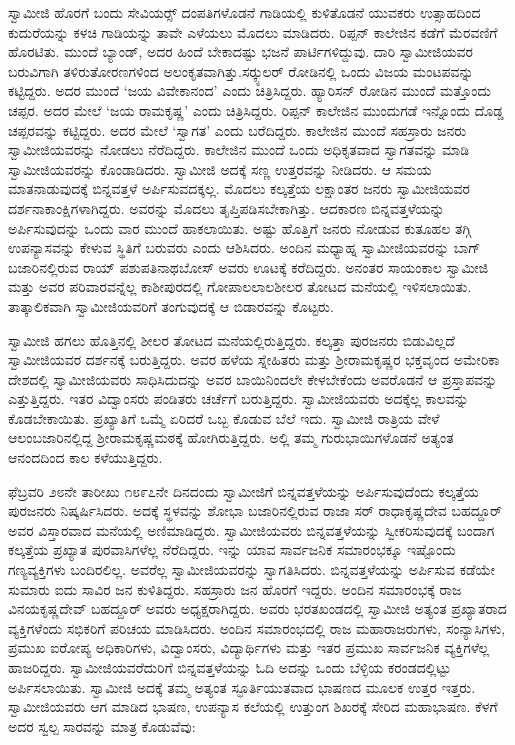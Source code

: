  ಸ್ವಾಮೀಜಿ ಹೊರಗೆ ಬಂದು ಸೇವಿಯರ್ಸ್‍‍ ದಂಪತಿಗಳೊಡನೆ ಗಾಡಿಯಲ್ಲಿ ಕುಳಿತೊಡನೆ ಯುವಕರು ಉತ್ಸಾಹದಿಂದ ಕುದುರೆಯನ್ನು ಕಳಚಿ ಗಾಡಿಯನ್ನು ತಾವೇ ಎಳೆಯಲು ಮೊದಲು ಮಾಡಿದರು. ರಿಪ್ಪನ್ ಕಾಲೇಜಿನ ಕಡೆಗೆ ಮೆರವಣಿಗೆ ಹೊರಟಿತು. ಮುಂದೆ ಬ್ಯಾಂಡ್, ಅದರ ಹಿಂದೆ ಬೇಕಾದಷ್ಟು ಭಜನೆ ಪಾರ್ಟಿಗಳಿದ್ದುವು. ದಾರಿ ಸ್ವಾಮೀಜಿಯವರ ಬರುವಿಗಾಗಿ ತಳಿರುತೋರಣಗಳಿಂದ ಅಲಂಕೃತವಾಗಿತ್ತು.\break ಸರ್‍ಕ್ಯುಲರ್ ರೋಡಿನಲ್ಲಿ ಒಂದು ವಿಜಯ ಮಂಟಪವನ್ನು ಕಟ್ಟಿದ್ದರು. ಅದರ ಮುಂದೆ ‘ಜಯ ವಿವೇಕಾನಂದ’ ಎಂದು ಚಿತ್ರಿಸಿದ್ದರು. ಹ್ಯಾರಿಸನ್ ರೋಡಿನ ಮುಂದೆ ಮತ್ತೊಂದು ಚಪ್ಪರ. ಅದರ ಮೇಲೆ ‘ಜಯ ರಾಮಕೃಷ್ಣ’ ಎಂದು ಚಿತ್ರಿಸಿದ್ದರು. ರಿಪ್ಪನ್ ಕಾಲೇಜಿನ ಮುಂದುಗಡೆ ಇನ್ನೊಂದು ದೊಡ್ಡ ಚಪ್ಪರವನ್ನು ಕಟ್ಟಿದ್ದರು. ಅದರ ಮೇಲೆ ‘ಸ್ವಾಗತ’ ಎಂದು ಬರೆದಿದ್ದರು. ಕಾಲೇಜಿನ ಮುಂದೆ ಸಹಸ್ರಾರು ಜನರು ಸ್ವಾಮೀಜಿಯವರನ್ನು ನೋಡಲು ನೆರೆದಿದ್ದರು. ಕಾಲೇಜಿನ ಮುಂದೆ ಒಂದು ಅಧಿಕೃತವಾದ ಸ್ವಾಗತವನ್ನು ಮಾಡಿ ಸ್ವಾಮೀಜಿಯವರನ್ನು ಕೊಂಡಾಡಿದರು. ಸ್ವಾಮೀಜಿ ಅದಕ್ಕೆ ಸಣ್ಣ ಉತ್ತರವನ್ನು ನೀಡಿದರು. ಆ ಸಮಯ ಮಾತನಾಡುವುದಕ್ಕೆ ಬಿನ್ನವತ್ತಳೆ ಅರ್ಪಿಸುವದಕ್ಕಲ್ಲ. ಮೊದಲು ಕಲ್ಕತ್ತೆಯ ಲಕ್ಷಾಂತರ ಜನರು ಸ್ವಾಮೀಜಿಯವರ ದರ್ಶನಾಕಾಂಕ್ಷಿಗಳಾಗಿದ್ದರು. ಅವರನ್ನು ಮೊದಲು ತೃಪ್ತಿಪಡಿಸಬೇಕಾಗಿತ್ತು. ಆದಕಾರಣ ಬಿನ್ನವತ್ತಳೆಯನ್ನು ಅರ್ಪಿಸುವುದನ್ನು ಒಂದು ವಾರ ಮುಂದೆ ಹಾಕಲಾಯಿತು. ಅಷ್ಟು ಹೊತ್ತಿಗೆ ಜನರು ನೋಡುವ ಕುತೂಹಲ ತಗ್ಗಿ ಉಪನ್ಯಾಸವನ್ನು ಕೇಳುವ ಸ್ಥಿತಿಗೆ ಬರುವರು ಎಂದು ಆಶಿಸಿದರು. ಅಂದಿನ ಮಧ್ಯಾಹ್ನ ಸ್ವಾಮೀಜಿಯವರನ್ನು ಬಾಗ್ ಬಜಾರಿನಲ್ಲಿರುವ ರಾಯ್ ಪಶುಪತಿನಾಥಬೋಸ್ ಅವರು ಊಟಕ್ಕೆ ಕರೆದಿದ್ದರು. ಅನಂತರ ಸಾಯಂಕಾಲ ಸ್ವಾಮೀಜಿ ಮತ್ತು ಅವರ ಪರಿವಾರವನ್ನೆಲ್ಲ ಕಾಶೀಪುರದಲ್ಲಿ ಗೋಪಾಲಲಾಲಶೀಲರ ತೋಟದ ಮನೆಯಲ್ಲಿ ಇಳಿಸಲಾಯಿತು. ತಾತ್ಕಾಲಿಕವಾಗಿ ಸ್ವಾಮೀಜಿಯವರಿಗೆ ತಂಗುವುದಕ್ಕೆ ಆ ಬಿಡಾರವನ್ನು ಕೊಟ್ಟರು. 

 ಸ್ವಾಮೀಜಿ ಹಗಲು ಹೊತ್ತಿನಲ್ಲಿ ಶೀಲರ ತೋಟದ ಮನೆಯಲ್ಲಿರುತ್ತಿದ್ದರು. ಕಲ್ಕತ್ತಾ ಪುರಜನರು ಬಿಡುವಿಲ್ಲದೆ ಸ್ವಾಮೀಜಿಯವರ ದರ್ಶನಕ್ಕೆ ಬರುತ್ತಿದ್ದರು. ಅವರ ಹಳೆಯ ಸ್ನೇಹಿತರು ಮತ್ತು ಶ‍್ರೀರಾಮಕೃಷ್ಣರ ಭಕ್ತವೃಂದ ಅಮೇರಿಕಾ ದೇಶದಲ್ಲಿ ಸ್ವಾಮೀಜಿಯವರು ಸಾಧಿಸಿದುದನ್ನು ಅವರ ಬಾಯಿನಿಂದಲೇ ಕೇಳಬೇಕೆಂದು ಅವರೊಡನೆ ಆ ಪ್ರಸ್ತಾಪವನ್ನು ಎತ್ತುತ್ತಿದ್ದರು. ಇತರ ವಿದ್ವಾಂಸರು ಪಂಡಿತರು ಚರ್ಚೆಗೆ ಬರುತ್ತಿದ್ದರು. ಸ್ವಾಮೀಜಿಯವರು ಅದಕ್ಕೆಲ್ಲ ಕಾಲವನ್ನು ಕೊಡಬೇಕಾಯಿತು. ಪ್ರಖ್ಯಾತಿಗೆ ಒಮ್ಮೆ ಏರಿದರೆ ಒಬ್ಬ ಕೊಡುವ ಬೆಲೆ ಇದು. ಸ್ವಾಮೀಜಿ ರಾತ್ರಿಯ ವೇಳೆ ಆಲಂಬಜಾರಿನಲ್ಲಿದ್ದ ಶ‍್ರೀರಾಮಕೃಷ್ಣಮಠಕ್ಕೆ ಹೋಗಿರುತ್ತಿದ್ದರು. ಅಲ್ಲಿ ತಮ್ಮ ಗುರುಭಾಯಿಗಳೊಡನೆ ಅತ್ಯಂತ ಆನಂದದಿಂದ ಕಾಲ ಕಳೆಯುತ್ತಿದ್ದರು. 

 ಫೆಬ್ರವರಿ ೨೮ನೇ ತಾರೀಖು ೧೮೯೭ನೇ ದಿನದಂದು ಸ್ವಾಮೀಜಿಗೆ ಬಿನ್ನವತ್ತಳೆಯನ್ನು ಅರ್ಪಿಸುವುದೆಂದು ಕಲ್ಕತ್ತೆಯ ಪುರಜನರು ನಿಷ್ಕರ್ಷಿಸಿದರು. ಅದಕ್ಕೆ ಸ್ಥಳವನ್ನು ಶೋಭಾ ಬಜಾರಿನಲ್ಲಿರುವ ರಾಜಾ ಸರ್ ರಾಧಾಕೃಷ್ಣದೇವ ಬಹದ್ದೂರ್ ಅವರ ವಿಸ್ತಾರವಾದ ಮನೆಯಲ್ಲಿ ಅಣಿಮಾಡಿದ್ದರು. ಸ್ವಾಮೀಜಿಯವರು ಬಿನ್ನವತ್ತಳೆಯನ್ನು ಸ್ವೀಕರಿಸುವುದಕ್ಕೆ ಬಂದಾಗ ಕಲ್ಕತ್ತೆಯ ಪ್ರಖ್ಯಾತ ಪುರವಾಸಿಗಳೆಲ್ಲ ನೆರೆದಿದ್ದರು. ಇನ್ನು ಯಾವ ಸಾರ್ವಜನಿಕ ಸಮಾರಂಭಕ್ಕೂ ಇಷ್ಟೊಂದು ಗಣ್ಯವ್ಯಕ್ತಿಗಳು ಬಂದಿರಲಿಲ್ಲ. ಅವರೆಲ್ಲ ಸ್ವಾಮೀಜಿಯವರನ್ನು ಸ್ವಾಗತಿಸಿದರು. ಬಿನ್ನವತ್ತಳೆಯನ್ನು ಅರ್ಪಿಸುವ ಕಡೆಯೇ ಸುಮಾರು ಐದು ಸಾವಿರ ಜನ ಕುಳಿತಿದ್ದರು. ಸಹಸ್ರಾರು ಜನ ಹೊರಗೆ ಇದ್ದರು. ಅಂದಿನ ಸಮಾರಂಭಕ್ಕೆ ರಾಜ ವಿನಯಕೃಷ್ಣದೇವ್ ಬಹದ್ದೂರ್ ಅವರು ಅಧ್ಯಕ್ಷರಾಗಿದ್ದರು. ಅವರು ಭರತಖಂಡದಲ್ಲಿ ಸ್ವಾಮೀಜಿ ಅತ್ಯಂತ ಪ್ರಖ್ಯಾತರಾದ ವ್ಯಕ್ತಿಗಳೆಂದು ಸಭಿಕರಿಗೆ ಪರಿಚಯ ಮಾಡಿಸಿದರು. ಅಂದಿನ ಸಮಾರಂಭದಲ್ಲಿ ರಾಜ ಮಹಾರಾಜರುಗಳು, ಸಂನ್ಯಾಸಿಗಳು, ಪ್ರಮುಖ ಐರೋಪ್ಯ ಅಧಿಕಾರಿಗಳು, ವಿದ್ವಾಂಸರು, ವಿದ್ಯಾರ್ಥಿಗಳು ಮತ್ತು ಇತರ ಪ್ರಮುಖ ಸಾರ್ವಜನಿಕ ವ್ಯಕ್ತಿಗಳೆಲ್ಲ ಹಾಜರಿದ್ದರು. ಸ್ವಾಮೀಜಿಯವರೆದುರಿಗೆ ಬಿನ್ನವತ್ತಳೆಯನ್ನು ಓದಿ ಅದನ್ನು ಒಂದು ಬೆಳ್ಳಿಯ ಕರಂಡದಲ್ಲಿಟ್ಟು ಅರ್ಪಿಸಲಾಯಿತು. ಸ್ವಾಮೀಜಿ ಅದಕ್ಕೆ ತಮ್ಮ ಅತ್ಯಂತ ಸ್ಫೂರ್ತಿಯುತವಾದ ಭಾಷಣದ ಮೂಲಕ ಉತ್ತರ ಇತ್ತರು. ಸ್ವಾಮೀಜಿಯವರು ಆಗ ಮಾಡಿದ ಭಾಷಣ, ಉಪನ್ಯಾಸ ಕಲೆಯಲ್ಲಿ ಉತ್ತುಂಗ ಶಿಖರಕ್ಕೆ ಸೇರಿದ ಮಹಾಭಾಷಣ. ಕೆಳಗೆ ಅದರ ಸ್ವಲ್ಪ ಸಾರವನ್ನು ಮಾತ್ರ ಕೊಡುವೆವು: 

